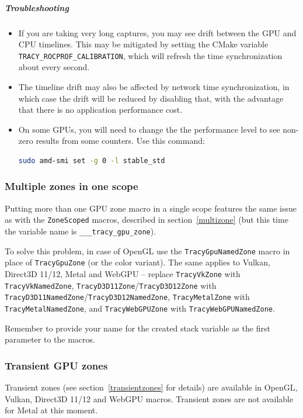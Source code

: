 \documentclass[hidelinks,titlepage,a4paper,twoside]{article}
\begin{document}
\subparagraph{Troubleshooting}
\begin{itemize}
\item If you are taking very long captures, you may see drift between the GPU and
  CPU timelines. This may be mitigated by setting the CMake variable
  \texttt{TRACY\_ROCPROF\_CALIBRATION}, which will refresh the time synchronization about every
  second.
\item The timeline drift may also be affected by network time synchronization, in which case the
  drift will be reduced by disabling that, with the advantage that there is no application performance
  cost.
\item On some GPUs, you will need to change the the performance level to see non-zero results from
  some counters. Use this command:
\begin{lstlisting}[language=sh]
sudo amd-smi set -g 0 -l stable_std
\end{lstlisting}
\end{itemize}

\subsubsection{Multiple zones in one scope}

Putting more than one GPU zone macro in a single scope features the same issue as with the \texttt{ZoneScoped} macros, described in section~\ref{multizone} (but this time the variable name is \texttt{\_\_\_tracy\_gpu\_zone}).

To solve this problem, in case of OpenGL use the \texttt{TracyGpuNamedZone} macro in place of \texttt{TracyGpuZone} (or the color variant). The same applies to Vulkan, Direct3D 11/12, Metal and WebGPU -- replace \texttt{TracyVkZone} with \texttt{TracyVkNamedZone}, \texttt{TracyD3D11Zone}/\texttt{TracyD3D12Zone} with \texttt{TracyD3D11NamedZone}/\texttt{TracyD3D12NamedZone}, \texttt{TracyMetalZone} with \texttt{TracyMetalNamedZone}, and \texttt{TracyWebGPUZone} with \texttt{TracyWebGPUNamedZone}.

Remember to provide your name for the created stack variable as the first parameter to the macros.

\subsubsection{Transient GPU zones}

Transient zones (see section~\ref{transientzones} for details) are available in OpenGL, Vulkan, Direct3D 11/12 and WebGPU macros. Transient zones are not available for Metal at this moment.
\end{document}
